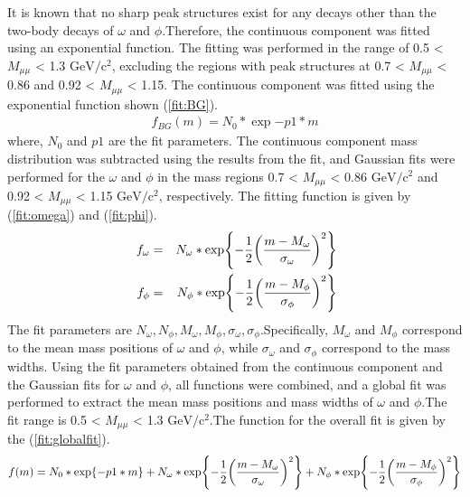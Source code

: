                 It is known that no sharp peak structures exist for any decays other than the two-body decays of \(\omega\) and \(\phi\).\@ Therefore, the continuous component was fitted using an exponential function. The fitting was performed in the range of 0.5 < \(M_{\mu\mu}\) < 1.3 \(\mathrm{GeV/c^2}\), excluding the regions with peak structures at 0.7 < \(M_{\mu\mu}\) < 0.86 and 0.92 < \(M_{\mu\mu}\) < 1.15. The continuous component was fitted using the exponential function shown (\ref{fit:BG}).\@
                \begin{eqnarray}
                    \label{fit:BG}
                    f_{BG}(m)=N_0*\exp{-p1* m}
                \end{eqnarray}
                where, \(N_0\) and \(p1\) are the fit parameters. The continuous component mass distribution was subtracted using the results from the fit, and Gaussian fits were performed for the \(\omega\) and \(\phi\) in the mass regions 0.7 < \(M_{\mu\mu}\) < 0.86 \(\mathrm{GeV/c^2}\) and 0.92 < \(M_{\mu\mu}\) < 1.15 \(\mathrm{GeV/c^2}\), respectively. The fitting function is given by (\ref{fit:omega}) and (\ref{fit:phi}).\@
                \begin{eqnarray}
                    \label{fit:omega}
                    f_{\omega} &=& N_{\omega}*\exp{-\frac{1}{2}\qty(\frac{m-M_{\omega}}{\sigma_{\omega}})^2}\\\
                    \label{fit:phi}
                    f_{\phi} &=& N_{\phi}*\exp{-\frac{1}{2}\qty(\frac{m-M_{\phi}}{\sigma_{\phi}})^2}
                \end{eqnarray}
                The fit parameters are \(N_{\omega}, N_{\phi}, M_{\omega}, M_{\phi}, \sigma_{\omega}, \sigma_{\phi}\).\@ Specifically, \(M_{\omega}\) and \(M_{\phi}\) correspond to the mean mass positions of \(\omega\) and \(\phi\), while \(\sigma_{\omega}\) and \(\sigma_{\phi}\) correspond to the mass widths. Using the fit parameters obtained from the continuous component and the Gaussian fits for \(\omega\) and \(\phi\), all functions were combined, and a global fit was performed to extract the mean mass positions and mass widths of \(\omega\) and \(\phi\).\@ The fit range is 0.5 < \(M_{\mu\mu}\) < 1.3 \(\mathrm{GeV/c^2}\).\@ The function for the overall fit is given by the (\ref{fit:globalfit}).
                \begin{eqnarray}
                    \label{fit:globalfit}
                    f(m)=N_0*\exp{-p1* m}+N_{\omega}*\exp{-\frac{1}{2}\qty(\frac{m-M_{\omega}}{\sigma_{\omega}})^2}+N_{\phi}*\exp{-\frac{1}{2}\qty(\frac{m-M_{\phi}}{\sigma_{\phi}})^2}
                \end{eqnarray}
